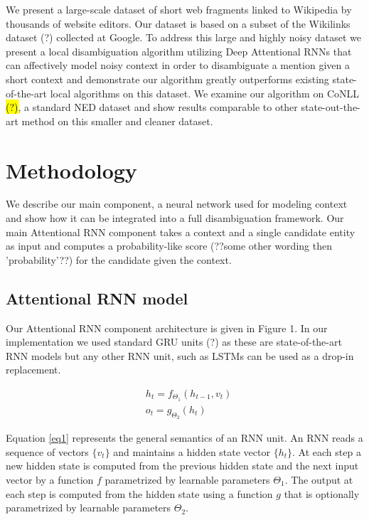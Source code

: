 \documentclass[11pt]{article}
\begin{document}
We present a large-scale dataset of short web fragments linked to Wikipedia by thousands of website editors. Our dataset is based on a subset of the Wikilinks dataset (?) collected at Google. To address this large and highly noisy dataset we present a local disambiguation algorithm utilizing Deep Attentional RNNs that can affectively model noisy context in order to disambiguate a mention given a short context and demonstrate our algorithm greatly outperforms existing state-of-the-art local algorithms on this dataset. We examine our algorithm on CoNLL \hl{(?)}, a standard NED dataset and show results comparable to other state-out-the-art method on this smaller and cleaner dataset.

\section{Methodology}

We describe our main component, a neural network used for modeling context and show how it can be integrated into a full disambiguation framework. Our main Attentional RNN component takes a context and a single candidate entity as input and computes a probability-like score (??some other wording then 'probability'??) for the candidate given the context. 

\subsection{Attentional RNN model}

Our Attentional RNN component architecture is given in Figure 1. In our implementation we used standard GRU units (?) as these are state-of-the-art RNN models but any other RNN unit, such as LSTMs can be used as a drop-in replacement. 

\begin{equation}
	\label{eq1}
	\begin{aligned}
		& h_t=f_{\Theta_1}(h_{t-1}, v_t) \\
		& o_t=g_{\Theta_2}(h_t)
	\end{aligned}
\end{equation}

Equation \ref{eq1} represents the general semantics of an RNN unit. An RNN reads a sequence of vectors $\{v_t\}$ and maintains a hidden state vector $\{h_t\}$. At each step a new hidden state is computed from the previous hidden state and the next input vector by a function $f$ parametrized by learnable parameters $\Theta_1$. The output at each step is computed from the hidden state using a function $g$ that is optionally parametrized by learnable parameters $\Theta_2$. 
\end{document}
